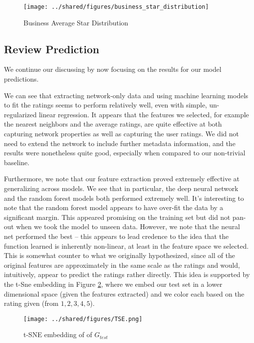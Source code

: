 \documentclass[letterpaper, 10 pt, conference]{ieeeconf}  %
\begin{document}
\begin{figure}[h!]
\centering
\texttt{[image: ../shared/figures/business\_star\_distribution]}
\caption{Business Average Star Distribution}
\label{fig:business_star_distribution}
\end{figure}

\subsection{Review Prediction}
We continue our discussing by now focusing on the results for our model predictions.

We can see that extracting network-only data and using machine learning models to fit the ratings seems to perform relatively well, even with simple, un-regularized linear regression. It appears that the features we selected, for example the nearest neighbors and the average ratings, are quite effective at both capturing network properties as well as capturing the user ratings. We did not need to extend the network to include further metadata information, and the results were nonetheless quite good, especially when compared to our non-trivial baseline.

Furthermore, we note that our feature extraction proved extremely effective at generalizing across models. We see that in particular, the deep neural network and the random forest models both performed extremely well. It's interesting to note that the random forest model appears to have over-fit the data by a significant margin. This appeared promising on the training set but did not pan-out when we took the model to unseen data. However, we note that the neural net performed the best -- this appears to lead credence to the idea that the function learned is inherently non-linear, at least in the feature space we selected. This is somewhat counter to what we originally hypothesized, since all of the original features are approximately in the same scale as the ratings and would, intuitively, appear to predict the ratings rather directly. This idea is supported by the t-Sne embedding in Figure \ref{fig:tsne_embedding}, where we embed our test set in a lower dimensional space (given the features extracted) and we color each based on the rating given (from $1,2,3,4,5$). 

\begin{figure}[h!]
\centering
\texttt{[image: ../shared/figures/TSE.png]}
\caption{t-SNE embedding of of $G_{test}$}
\label{fig:tsne_embedding}
\end{figure}
\end{document}
